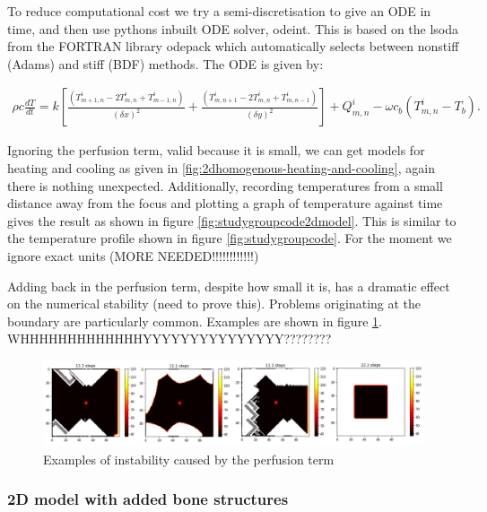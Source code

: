 \documentclass[11pt]{article} %
\begin{document}
To reduce computational cost we try a semi-discretisation to give an ODE in time, and then use pythons inbuilt ODE solver, odeint. This is based on the  lsoda from the FORTRAN library odepack which automatically selects between nonstiff (Adams) and stiff (BDF) methods. The ODE is given by:

\begin{eqnarray}
\rho c \frac{dT}{dt}= k\left[  \frac{(T^i_{m+1,n}-2T^i_{m,n}+T^i_{m-1,n})}{(\delta x)^2}+\frac{(T^i_{m,n+1}-2T^i_{m,n}+T^i_{m,n-1})}{(\delta y)^2}\right] +Q^i_{m,n}-\omega c_b(T^i_{m,n}-T_b).
\end{eqnarray}

Ignoring the perfusion term, valid because it is small, we can get models for heating and cooling as given in \ref{fig:2dhomogenous-heating-and-cooling}, again there is nothing unexpected. Additionally, recording temperatures from a small distance away from the focus and plotting a graph of temperature against time gives the result as shown in figure \ref{fig:studygroupcode2dmodel}. This is similar to the temperature profile shown in figure \ref{fig:studygroupcode}. For the moment we ignore exact units (MORE NEEDED!!!!!!!!!!!!)

Adding back in the perfusion term, despite how small it is, has a dramatic effect on the numerical stability (need to prove this). Problems originating at the boundary are particularly common. Examples are shown in figure \ref{fig:instability}. WHHHHHHHHHHHHHYYYYYYYYYYYYYYY????????

 
 
  



\begin{figure}
	\centering
	\includegraphics[width=0.95\linewidth]{Report_images/instability}
	\caption{Examples of instability caused by the perfusion term}
	\label{fig:instability}
\end{figure}

\subsubsection{2D model with added bone structures}	 	
\end{document}
